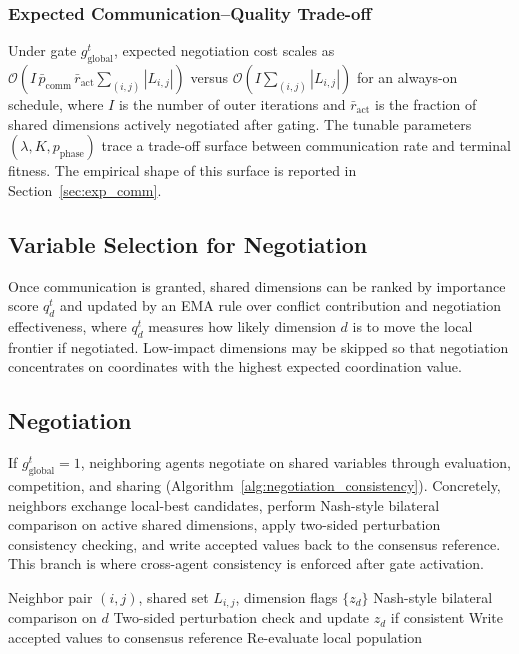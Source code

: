 \documentclass[conference]{IEEEtran}
\begin{document}
\subsubsection{Expected Communication--Quality Trade-off}
Under gate $g_{\mathrm{global}}^t$, expected negotiation cost scales as $\mathcal{O}(I\,\bar p_{\mathrm{comm}}\,\bar r_{\mathrm{act}}\sum_{(i,j)}|L_{i,j}|)$ versus $\mathcal{O}(I\sum_{(i,j)}|L_{i,j}|)$ for an always-on schedule, where $I$ is the number of outer iterations and $\bar r_{\mathrm{act}}$ is the fraction of shared dimensions actively negotiated after gating. The tunable parameters $(\lambda,K,p_{\mathrm{phase}})$ trace a trade-off surface between communication rate and terminal fitness. The empirical shape of this surface is reported in Section~\ref{sec:exp_comm}.

\subsection{Variable Selection for Negotiation}\label{sec:selection}
Once communication is granted, shared dimensions can be ranked by importance score $q_d^t$ and updated by an EMA rule over conflict contribution and negotiation effectiveness, where $q_d^t$ measures how likely dimension $d$ is to move the local frontier if negotiated. Low-impact dimensions may be skipped so that negotiation concentrates on coordinates with the highest expected coordination value.

\subsection{Negotiation}\label{sec:negotiation}
If $g_{\mathrm{global}}^t=1$, neighboring agents negotiate on shared variables through evaluation, competition, and sharing (Algorithm~\ref{alg:negotiation_consistency}). Concretely, neighbors exchange local-best candidates, perform Nash-style bilateral comparison on active shared dimensions, apply two-sided perturbation consistency checking, and write accepted values back to the consensus reference. This branch is where cross-agent consistency is enforced after gate activation.

\begin{algorithm}[t]
  \footnotesize
  \caption{Negotiation with Two-Sided Consistency Check}
  \label{alg:negotiation_consistency}
  \begin{algorithmic}[1]
  \Require Neighbor pair $(i,j)$, shared set $L_{i,j}$, dimension flags $\{z_d\}$
    \State Nash-style bilateral comparison on $d$
    \State Two-sided perturbation check and update $z_d$ if consistent
    \State Write accepted values to consensus reference
  \EndFor
  \State Re-evaluate local population
  \end{algorithmic}
\end{algorithm}
\end{document}
